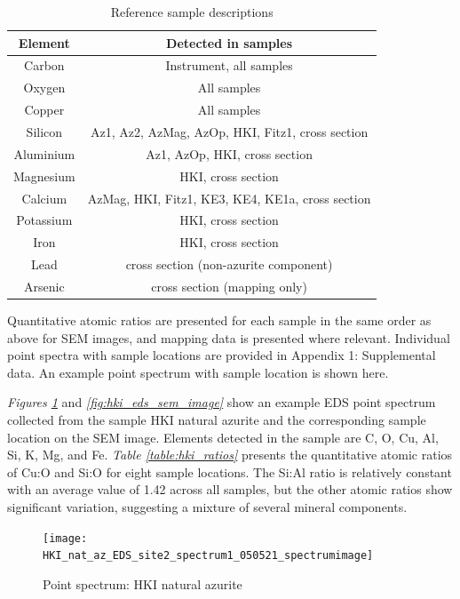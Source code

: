 \begin{table}[H]
\caption{Reference sample descriptions}
\centering
\label{table:eds_elems}
\begin{tabular}{c c}
\toprule
Element & Detected in samples \\
\midrule
Carbon & Instrument, all samples \\
Oxygen & All samples \\
Copper & All samples \\
Silicon & Az1, Az2, AzMag, AzOp, HKI, Fitz1, cross section \\
Aluminium & Az1, AzOp, HKI, cross section \\
Magnesium & HKI, cross section \\
Calcium & AzMag, HKI, Fitz1, KE3, KE4, KE1a, cross section \\
Potassium & HKI, cross section \\
Iron & HKI, cross section \\
Lead & cross section (non-azurite component) \\
Arsenic & cross section (mapping only) \\
\bottomrule
\end{tabular}
\end{table}

Quantitative atomic ratios are presented for each sample in the same order as above for SEM images, and mapping data is presented where relevant. Individual point spectra with sample locations are provided in Appendix 1: Supplemental data. An example point spectrum with sample location is shown here.

\textit{Figures \ref{fig:hki_eds_spectrum}} and \textit{\ref{fig:hki_eds_sem_image}} show an example EDS point spectrum collected from the sample HKI natural azurite and the corresponding sample location on the SEM image. Elements detected in the sample are C, O, Cu, Al, Si, K, Mg, and Fe. \textit{Table \ref{table:hki_ratios}} presents the quantitative atomic ratios of Cu:O and Si:O for eight sample locations. The Si:Al ratio is relatively constant with an average value of 1.42 across all samples, but the other atomic ratios show significant variation, suggesting a mixture of several mineral components.

\begin{figure}[H]
\centering
  \texttt{[image: HKI\_nat\_az\_EDS\_site2\_spectrum1\_050521\_spectrumimage]}
\caption[Point spectrum: HKI natural azurite]{Point spectrum: HKI natural azurite}
\label{fig:hki_eds_spectrum}
\end{figure}

